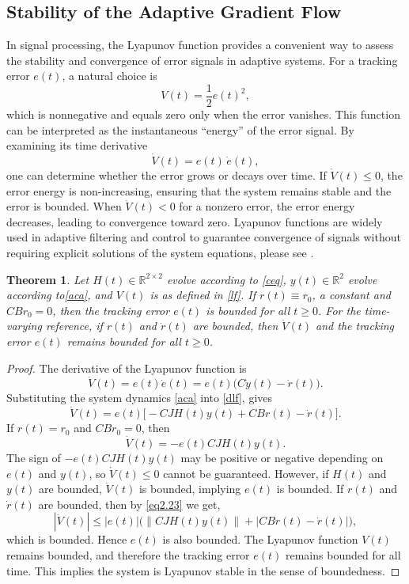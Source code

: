 \documentclass[reqno]{amsart}
\numberwithin{equation}{section}
\newtheorem{theorem}{Theorem}[section]
\begin{document}
\subsection{Stability of the Adaptive Gradient Flow}
In signal processing, the Lyapunov function provides a convenient way to assess the stability and convergence of error signals in adaptive systems. For a tracking error $e(t)$, a natural choice is
\begin{equation} \label{lf}
V(t) = \frac{1}{2} e(t)^2,
\end{equation}
which is nonnegative and equals zero only when the error vanishes. This function can be interpreted as the instantaneous ``energy'' of the error signal. By examining its time derivative
\[
\dot V(t) = e(t)\, \dot e(t),
\]
one can determine whether the error grows or decays over time. If $\dot V(t) \le 0$, the error energy is non-increasing, ensuring that the system remains stable and the error is bounded. When $\dot V(t) < 0$ for a nonzero error, the error energy decreases, leading to convergence toward zero. Lyapunov functions are widely used in adaptive filtering and control to guarantee convergence of signals without requiring explicit solutions of the system equations, please see \cite{Haykin2014}.

\begin{theorem}
Let $H(t) \in \mathbb{R}^{2\times 2}$ evolve according to \eqref{ceq},   $y(t) \in \mathbb{R}^2$ evolve according to\eqref{aca}, and $V(t)$ is as defined in \eqref{lf}.  If $r(t) \equiv r_0$, a constant and $C B r_0 = 0$, then the tracking error $e(t)$ is bounded for all $t\geq 0 $. For the time-varying reference, if $r(t)$ and $\dot r(t)$ are bounded, then $\dot V(t)$    and the tracking error $e(t)$ remains bounded for all $t\geq 0 $.
 
 
\end{theorem}
\begin{proof}
The derivative of the Lyapunov function is
\begin{equation} \label{dlf}
\dot V(t) = e(t) \dot e(t) = e(t) \big(C \dot y(t) - \dot r(t)\big).
\end{equation}
Substituting the system dynamics \eqref{aca} into \eqref{dlf}, gives
\begin{equation}\label{eq2.23}
\dot V(t) = e(t) \big[- C J H(t) y(t) + C B r(t) - \dot r(t)\big].
\end{equation}
 If $r(t) = r_0$ and $C B r_0 = 0$, then
\[
\dot V(t) = - e(t) C J H(t) y(t).
\]
The sign of $- e(t) CJ H(t) y(t)$ may be positive or negative depending on $e(t)$ and $y(t)$, so $\dot V(t) \le 0$ cannot be guaranteed. However, if $H(t)$ and $y(t)$ are bounded, $\dot V(t)$ is bounded, implying $e(t)$ is bounded. If $r(t)$ and $\dot r(t)$ are bounded, then by \eqref{eq2.23} we get,
\[
|\dot V(t)| \le |e(t)| \Big( \|CJ H(t) y(t)\| + |C B r(t) - \dot r(t)| \Big),
\]
which is bounded. Hence $e(t) $ is also bounded. The Lyapunov function $V(t)$ remains bounded, and therefore the tracking error $e(t)$ remains bounded for all time. This implies the system is  Lyapunov stable in the sense of boundedness. 
\end{proof}
\end{document}
